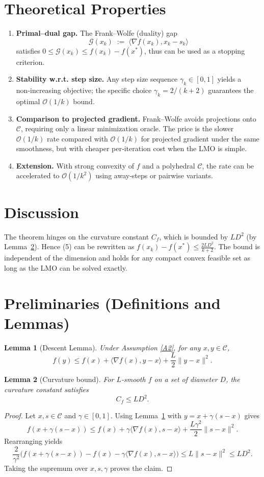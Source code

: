 \documentclass[11pt]{article}
\newtheorem{lemma}{Lemma}
\newcommand{\Cset}{\mathcal{C}}
\newcommand{\gap}{\mathcal{G}}
\begin{document}
\section*{Theoretical Properties}
\begin{enumerate}[label=\textbf{P\arabic*:}, leftmargin=*]
\item \textbf{Primal–dual gap.} The Frank–Wolfe (duality) gap
\[
\gap(x_{k})\;:=\;\langle \nabla f(x_{k}),x_{k}-s_{k}\rangle
\tag{6}
\]
satisfies $0\le\gap(x_{k})\le f(x_{k})-f(x^{*})$, thus can be used as a stopping
criterion.
\item \textbf{Stability w.r.t. step size.} Any step size sequence
$\gamma_{k}\in[0,1]$ yields a non‑increasing objective; the specific choice
$\gamma_{k}=2/(k+2)$ guarantees the optimal $\mathcal{O}(1/k)$ bound.
\item \textbf{Comparison to projected gradient.} Frank–Wolfe avoids
projections onto $\Cset$, requiring only a linear minimization oracle. The
price is the slower $\mathcal{O}(1/k)$ rate compared with $\mathcal{O}(1/k)$ for
projected gradient under the same smoothness, but with cheaper per‑iteration
cost when the LMO is simple.
\item \textbf{Extension.} With strong convexity of $f$ and a polyhedral
$\Cset$, the rate can be accelerated to $\mathcal{O}(1/k^{2})$ using
away‑steps or pairwise variants.
\end{enumerate}

\section*{Discussion}
The theorem hinges on the curvature constant $C_{f}$, which is bounded by
$L D^{2}$ (by Lemma~\ref{lem:curv-bound}). Hence (5) can be rewritten as
$f(x_{k})-f(x^{*})\le \frac{2LD^{2}}{k+2}$. The bound is independent of the
dimension and holds for any compact convex feasible set as long as the LMO can
be solved exactly.

\newpage
\section*{Preliminaries (Definitions and Lemmas)}
\begin{lemma}[Descent Lemma]\label{lem:descent}
Under Assumption \ref{A2}, for any $x,y\in\Cset$,
\[
f(y)\le f(x)+\langle\nabla f(x),y-x\rangle+\frac{L}{2}\|y-x\|^{2}.
\]
\end{lemma}
\begin{lemma}[Curvature bound]\label{lem:curv-bound}
For $L$‑smooth $f$ on a set of diameter $D$, the curvature constant satisfies
\[
C_{f}\le L D^{2}.
\]
\end{lemma}
\begin{proof}
Let $x,s\in\Cset$ and $\gamma\in[0,1]$. Using Lemma~\ref{lem:descent} with
$y=x+\gamma(s-x)$ gives
\[
f(x+\gamma(s-x))\le f(x)+\gamma\langle\nabla f(x),s-x\rangle+\frac{L\gamma^{2}}{2}\|s-x\|^{2}.
\]
Rearranging yields
\[
\frac{2}{\gamma^{2}}\bigl(f(x+\gamma(s-x))-f(x)-\gamma\langle\nabla f(x),s-x\rangle\bigr)
\le L\|s-x\|^{2}\le LD^{2}.
\]
Taking the supremum over $x,s,\gamma$ proves the claim. \hfill\qedsymbol
\end{proof}
\end{document}
